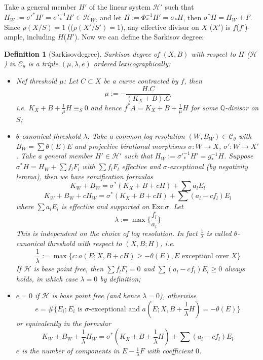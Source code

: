 \documentclass{article}
\newtheorem{defn}{Definition}[subsection]
\begin{document}
Take a general member $ H' $ of the linear system $ \mathcal{H}' $ such that $ H_W:=\sigma'^*H'=\sigma'^{-1}_*H'\in \mathcal{H}_W $, and let $ H:=\Phi^{-1}_*H'=\sigma_*H $, then $ \sigma^*H=H_W+F $. Since $ \rho(X/S)=1 $ (($\rho( X'/S')=1 $), any effective divisor on $ X $ ($ X' $) is $ f $($ f' $)-ample, including $ H $($ H' $). Now we can define the Sarkisov degree:
\begin{defn}[Sarkisovdegree]
  Sarkisov degree of $ (X,B) $ with respect to $ H $ ($ \mathcal{H} $) in $ \mathcal{C}_\theta $ is a triple $ (\mu,\lambda,e) $ ordered lexicographically:
  \begin{itemize}
    \item Nef threshold $ \mu $: Let $ C\subset X  $ be a curve contracted by $ f $, then 
      \[ \mu:=-\frac{H.C}{(K_X+B).C} \]
      i.e. $ K_X+B+\frac{1}{\mu} H \equiv_S0$ and hence $ f^*A=K_X+B+\frac{1}{\mu} H $ for some $ \mathbb{Q} $-divisor on $ S $;
    \item $ \theta $-canonical threshold $ \lambda $: Take a common log resolution  $ (W,B_W)\in \mathcal{C}_\theta $ with $ B_W=\sum \theta(E)E $ and projective birational morphisms $ \sigma:W\to X $, $ \sigma':W\to X' $. Take a general member $ H'\in \mathcal{H}' $ such that $ H_W:=\sigma'^{-1}_*H'=g^{-1}_*H $. Suppose $ \sigma^*H=H_W+\sum f_lF_l $ with $ \sum f_lF_l $ effective and $ \sigma $-exceptional (by negativity lemma), then we have ramification formulas
      \[ K_W+B_W=\sigma^*(K_X+B+cH)+\sum a_lE_l  \]
      \[ K_W+B_W+cH_W=\sigma^*(K_X+B+cH)+\sum(a_l-cf_l)E_l \]
      where $ \sum a_lE_l $ is effective and supported on $ \mathrm{Exc}\,\sigma $.   Let
      \[ \lambda:=\max\{ \frac{f_l}{a_l}\} \]
      This is independent on the choice of log resolution. In fact $ \frac{1}{\lambda} $ is called $ \theta $-canonical threshold with respect to $ (X,B;H) $, i.e.
      \[ \frac{1}{\lambda}:=\max\{c:a(E;X,B+cH)\geqslant-\theta(E) ,E\text{ exceptionl over }X \}\] 
      If $ \mathcal{H} $ is base point free, then $ \sum f_lF_l=0 $ and $\sum(a_l-cf_l)E_l\geqslant 0  $ always holds, in which case $ \lambda=0 $ by definition;
    \item $ e=0 $ if $ \mathcal{H} $ is base point free (and hence $ \lambda=0 $), otherwise 
      \[ e=\#\{E_i; E_i \text{ is }\sigma\text{-exceptional and } a(E;X,B+\frac{1}{\lambda} H)=-\theta(E) \} \]
      or equivalently in the formular 
      \[ K_W+B_W+\frac{1}{\lambda} H_W=\sigma^*(K_X+B+\frac{1}{\lambda} H)+\sum(a_l-cf_l)E_l \]
      $ e $ is the number of components in $ E-\frac{1}{\lambda} F $ with coefficient $ 0 $. 
  \end{itemize}
\end{defn}
\end{document}
